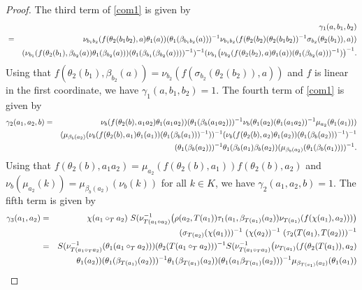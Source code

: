 \documentclass[10pt,a4paper]{amsart}
\begin{document}
\begin{proof}
	The third term of \eqref{com1} is given by
	\begin{eqnarray}\label{t1}
		&& \gamma_1(a, b_1, b_2) \notag\\
		&=&	  \nu_{b_1 b_2}(f(\theta_2(b_1 b_2), a)\theta_1(a))(\theta_1(\beta_{b_1 b_2}(a)))^{-1} \nu_{b_1 b_2}(f( \theta_2(b_2)(\theta_2(b_1 b_2))^{-1}\sigma_{b_2}(\theta_2(b_1)), a))\notag \\ 
		&&(\nu_{b_1}(f(\theta_2(b_1), \beta_{b_2}(a))\theta_1(\beta_{b_2}(a)))(\theta_1(\beta_{b_1}(\beta_{b_2}(a))))^{-1})^{-1}(\nu_{b_1}\big( \nu_{b_2}(f(\theta_2(b_2), a)\theta_1(a))(\theta_1(\beta_{b_2}(a)))^{-1})\big)^{-1}. \notag
	\end{eqnarray}
Using that $f(\theta_2(b_1), \beta_{b_2}(a))= \nu_{b_2}(f(\sigma_{b_2}(\theta_2(b_2)),a))$ and $f$ is linear in the first coordinate, we have $\gamma_1(a, b_1, b_2)=1$. The fourth term of \eqref{com1} is given by
	\begin{eqnarray}
		\gamma_2(a_1, a_2,b) &= & \nu_b(f(\theta_2(b), a_1a_2)\theta_1(a_1 a_2))(\theta_1(\beta_b(a_1 a_2)))^{-1} \nu_{b}(\theta_1(a_2)(\theta_1(a_1 a_2))^{-1}\mu_{a_2}(\theta_1(a_1))) \notag\\
		&&  (\mu_{ \beta_{b}(a_2)}(\nu_b(f(\theta_2(b), a_1)\theta_1(a_1))(\theta_1(\beta_b(a_1)))^{-1}))^{-1} (\nu_b(f(\theta_2(b), a_2)\theta_1(a_2)) (\theta_1(\beta_b(a_2)))^{-1})^{-1}\notag\\
		&&(\theta_1(\beta_{b}(a_2)))^{-1}\theta_1(\beta_{b}(a_1)\beta_{b}(a_2))(\mu_{\beta_{b}(a_2)}(\theta_1(\beta_{b}(a_1))))^{-1}.\notag
	\end{eqnarray}
	Using that $f(\theta_2(b), a_1 a_2) =  \mu_{ a_2}(f(\theta_2(b),a_1))f(\theta_2(b), a_2)$ and $\nu_b(\mu_{ a_2}(k))=\mu_{ \beta_{b}(a_2)}(\nu_b(k))$ for all $k \in K$, we have $\gamma_2(a_1, a_2,b)=1$. The fifth term is given by 
	\begin{eqnarray*}
		\gamma_3(a_1, a_2) &= & \chi(a_1 \circ_T a_2) ~S(\nu^{-1}_{T(a_1 \circ a_2)}\big(\rho(a_2, T(a_1))\tau_1(a_1,\beta_{T(a_1)}(a_2)) \nu_{T(a_1)}(f(\chi(a_1), a_2)))\big)\notag\\
		&& (\sigma_{T(a_2)}( \chi(a_1)))^{-1} ~(\chi(a_2))^{-1} ~(\tau_2(T(a_1), T(a_2) ))^{-1} \notag\\
		&= &  S(\nu^{-1}_{T(a_1 \circ_T a_2)}(\theta_1(a_1 \circ_T a_2))) (\theta_2(T(a_1 \circ_T a_2)))^{-1} S(\nu^{-1}_{T(a_1 \circ_T a_2)}\big( \nu_{T(a_1)}(f(\theta_2(T(a_1)), a_2)\notag\\
		&& \theta_1(a_2))(\theta_1(\beta_{T(a_1)}(a_2)))^{-1} \theta_1(\beta_{T(a_1)}(a_2))(\theta_1(a_1 \beta_{T(a_1)}(a_2)))^{-1}\mu_{\beta_{T(a_1)}(a_2)}(\theta_1(a_1))\notag\\

\end{eqnarray*}
\end{proof}
\end{document}
